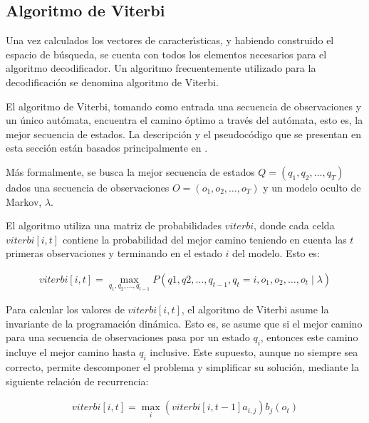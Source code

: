 \subsection{Algoritmo de Viterbi}
Una vez calculados los vectores de caracter{\'\i}sticas, y habiendo construido el espacio de b\'usqueda, 
se cuenta con todos los elementos necesarios para el algoritmo decodificador. Un algoritmo frecuentemente 
utilizado para la decodificaci\'on se denomina algoritmo de Viterbi.

El algoritmo de Viterbi, tomando como entrada una secuencia de observaciones y un \'unico aut\'omata, 
encuentra el camino \'optimo a trav\'es del aut\'omata, esto es, la mejor secuencia de estados. 
La descripci\'on y el pseudoc\'odigo que se presentan en esta secci\'on
est\'an basados principalmente en \cite{Jurafsky, Rabiner89atutorial}.

M\'as formalmente, se busca la mejor secuencia de estados $Q = (q_1,q_2,\ldots,q_T)$ 
dados una secuencia de observaciones $O = (o_1,o_2,\ldots,o_T)$ y un modelo oculto de Markov, $\lambda$.

El algoritmo utiliza una matriz de probabilidades $viterbi$, donde cada celda $viterbi[i,t]$ 
contiene la probabilidad del mejor camino teniendo en cuenta las $t$ primeras observaciones y 
terminando en el estado $i$ del modelo. Esto es:

\begin{align}
	viterbi[i,t] = \displaystyle \max_{q_1,q_2,\ldots,q_{t - 1}} P(q1,q2,\ldots,q_{t - 1},
		q_t = i,o_1,o_2,\ldots,o_t \mid \lambda) 	
\end{align} 

Para calcular los valores de $viterbi[i,t]$, el algoritmo de Viterbi asume la invariante de la 
programaci\'on din\'amica. Esto es, se asume que si el mejor camino para una secuencia de observaciones 
pasa por un estado $q_i$, entonces este camino incluye el mejor camino hasta $q_i$ inclusive. 
Este supuesto, aunque no siempre sea correcto, permite descomponer el problema y simplificar su soluci\'on,
mediante la siguiente relaci\'on de recurrencia:

\begin{align}
	viterbi[i,t] = \displaystyle \max_i (viterbi[i,t-1]a_{i,j})b_j(o_t)
\end{align}

